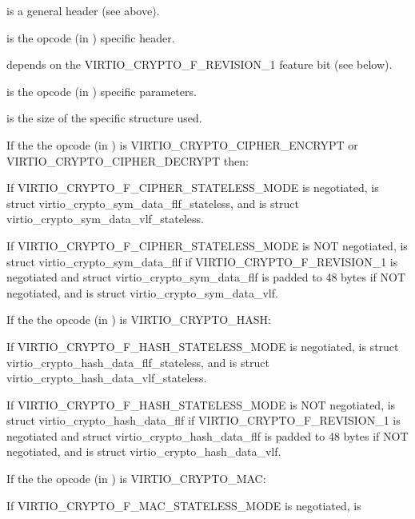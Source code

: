  is a general header (see above).

 is the opcode (in ) specific header.

 depends on the VIRTIO_CRYPTO_F_REVISION_1 feature bit
(see below).

 is the opcode (in ) specific parameters.

 is the size of the specific structure used.

\begin{itemize*}
\item If the the opcode (in ) is VIRTIO_CRYPTO_CIPHER_ENCRYPT
    or VIRTIO_CRYPTO_CIPHER_DECRYPT then:
    \begin{itemize*}
    \item If VIRTIO_CRYPTO_F_CIPHER_STATELESS_MODE is negotiated,  is
        struct virtio_crypto_sym_data_flf_stateless, and  is struct
        virtio_crypto_sym_data_vlf_stateless.
    \item If VIRTIO_CRYPTO_F_CIPHER_STATELESS_MODE is NOT negotiated, 
        is struct virtio_crypto_sym_data_flf if VIRTIO_CRYPTO_F_REVISION_1 is negotiated
        and struct virtio_crypto_sym_data_flf is padded to 48 bytes if NOT negotiated,
        and  is struct virtio_crypto_sym_data_vlf.
    \end{itemize*}
\item If the the opcode (in ) is VIRTIO_CRYPTO_HASH:
    \begin{itemize*}
    \item If VIRTIO_CRYPTO_F_HASH_STATELESS_MODE is negotiated,  is
        struct virtio_crypto_hash_data_flf_stateless, and  is struct
        virtio_crypto_hash_data_vlf_stateless.
    \item If VIRTIO_CRYPTO_F_HASH_STATELESS_MODE is NOT negotiated, 
        is struct virtio_crypto_hash_data_flf if VIRTIO_CRYPTO_F_REVISION_1 is negotiated
        and struct virtio_crypto_hash_data_flf is padded to 48 bytes if NOT negotiated,
        and  is struct virtio_crypto_hash_data_vlf.
    \end{itemize*}
\item If the the opcode (in ) is VIRTIO_CRYPTO_MAC:
    \begin{itemize*}
    \item If VIRTIO_CRYPTO_F_MAC_STATELESS_MODE is negotiated,  is

\end{itemize*}
\end{itemize*}
